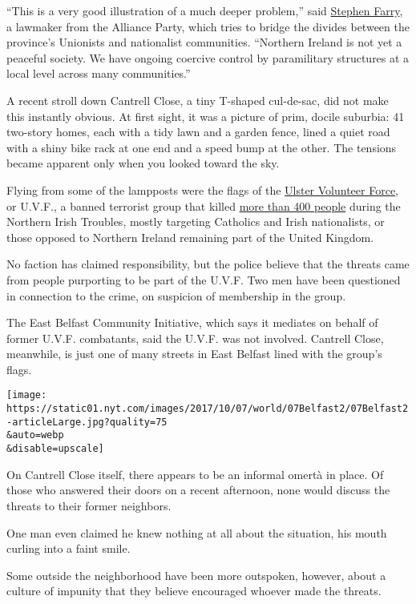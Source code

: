 ``This is a very good illustration of a much deeper problem,'' said
\href{https://en.wikipedia.org/wiki/Stephen_Farry}{Stephen Farry}, a
lawmaker from the Alliance Party, which tries to bridge the divides
between the province's Unionists and nationalist communities. ``Northern
Ireland is not yet a peaceful society. We have ongoing coercive control
by paramilitary structures at a local level across many communities.''

A recent stroll down Cantrell Close, a tiny T-shaped cul-de-sac, did not
make this instantly obvious. At first sight, it was a picture of prim,
docile suburbia: 41 two-story homes, each with a tidy lawn and a garden
fence, lined a quiet road with a shiny bike rack at one end and a speed
bump at the other. The tensions became apparent only when you looked
toward the sky.

Flying from some of the lampposts were the flags of the
\href{https://en.wikipedia.org/wiki/Ulster_Volunteer_Force}{Ulster
Volunteer Force}, or U.V.F., a banned terrorist group that killed
\href{http://cain.ulst.ac.uk/sutton/tables/Organisation_Responsible.html}{more
than 400 people} during the Northern Irish Troubles, mostly targeting
Catholics and Irish nationalists, or those opposed to Northern Ireland
remaining part of the United Kingdom.

No faction has claimed responsibility, but the police believe that the
threats came from people purporting to be part of the U.V.F. Two men
have been questioned in connection to the crime, on suspicion of
membership in the group.

The East Belfast Community Initiative, which says it mediates on behalf
of former U.V.F. combatants, said the U.V.F. was not involved. Cantrell
Close, meanwhile, is just one of many streets in East Belfast lined with
the group's flags.

\texttt{[image: https://static01.nyt.com/images/2017/10/07/world/07Belfast2/07Belfast2-articleLarge.jpg?quality=75\\\&auto=webp\\\&disable=upscale]}

On Cantrell Close itself, there appears to be an informal omertà in
place. Of those who answered their doors on a recent afternoon, none
would discuss the threats to their former neighbors.

One man even claimed he knew nothing at all about the situation, his
mouth curling into a faint smile.

Some outside the neighborhood have been more outspoken, however, about a
culture of impunity that they believe encouraged whoever made the
threats.

